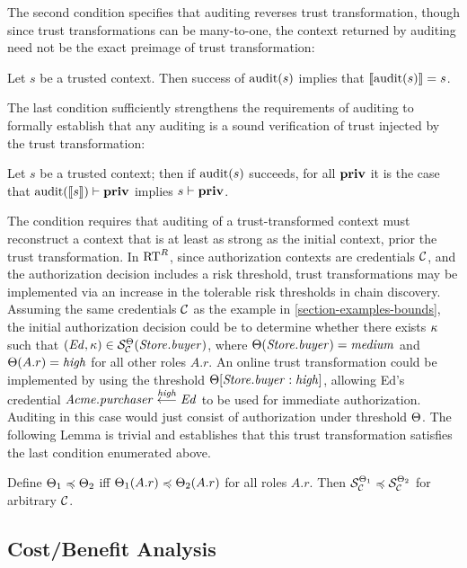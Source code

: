 The second condition specifies that auditing reverses trust
transformation, though since trust transformations can be many-to-one,
the context returned by auditing need not be the exact preimage
of trust transformation:
\begin{condition}
\label{cond-extrapolate}
Let $s$ be a trusted context. Then success of $\audit(s)$ implies that
$\cod{\audit(s)} = s$.
\end{condition}
The last condition sufficiently strengthens the requirements of
auditing to formally establish that any auditing is a sound
verification of trust injected by the trust transformation:
\begin{condition}
\label{cond-audit}
Let $s$ be a trusted context; then if $\audit(s)$ succeeds, for all 
$\priv$ it is the case that $\audit(\cod{s}) \vdash \priv$ implies
$s \vdash \priv$. 
\end{condition}
The condition requires that auditing of a trust-transformed context
must reconstruct a context that is at least as strong as the initial
context, prior the trust transformation.  In $\RTR$, since
authorization contexts are credentials $\creds$, and the authorization
decision includes a risk threshold, trust transformations may be
implemented via an increase in the tolerable risk thresholds in chain
discovery.  Assuming the same credentials $\creds$ as the example in
\autoref{section-examples-bounds}, the initial authorization decision
could be to determine whether there exists $\risk$ such that
$(\mathit{Ed},\risk) \in
\credsmean{\creds}^\thresh(\mathit{Store.buyer})$, where
$\thresh(\mathit{Store.buyer}) = \mathit{medium}$ and $\thresh(A.r) =
\mathit{high}$ for all other roles $A.r$.  An online trust
transformation could be implemented by using the threshold
$\shadowmap{\thresh}{\mathit{Store.buyer}}{\mathit{high}}$,
allowing Ed's credential $\mathitcred{Acme.purchaser}{Ed}{high}$ to be
used for immediate authorization.  Auditing in this case would just
consist of authorization under threshold $\thresh$.  The following
Lemma is trivial and establishes that this trust transformation
satisfies the last condition enumerated above.
\begin{lemma}
Define $\thresh_1 \po \thresh_2$ iff $\thresh_1(A.r) \po
\thresh_2(A.r)$ for all roles $A.r$.  Then $\credsmean{\creds}^{\thresh_1}
\po \credsmean{\creds}^{\thresh_2}$ for arbitrary $\creds$.
\end{lemma}

\subsection{Cost/Benefit Analysis}
\label{section-applications-cost-benefit}

